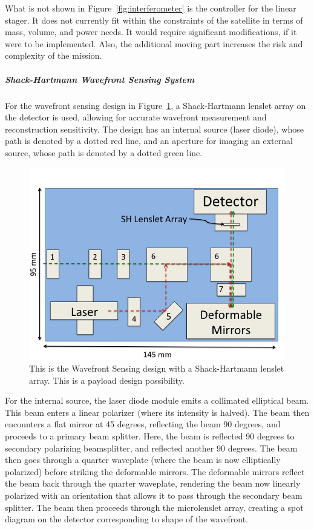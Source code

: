 \documentclass[12pt]{article}
\begin{document}
What is not shown in Figure~\ref{fig:interferometer} is the controller for the linear stager. It does not currently fit within the constraints of the satellite in terms of mass, volume, and power needs. It would require significant modifications, if it were to be implemented. Also, the additional moving part increases the risk and complexity of the mission.

\subparagraph{Shack-Hartmann Wavefront Sensing System}
For the wavefront sensing design in Figure~\ref{fig:SHWFS}, a Shack-Hartmann lenslet array on the detector is used, allowing for accurate wavefront measurement and reconstruction sensitivity. The design has an internal source (laser diode), whose path is denoted by a dotted red line, and an aperture for imaging an external source, whose path is denoted by a dotted green line.

\begin{figure}[ht]
\centering
  \includegraphics[width=5in]{images/payload_SHWFS.jpg}
\caption{This is the Wavefront Sensing design with a Shack-Hartmann lenslet array.  This is a payload design possibility.}
\label{fig:SHWFS}
\end{figure}

For the internal source, the laser diode module emits a collimated elliptical beam. This beam enters a linear polarizer (where its intensity is halved). The beam then encounters a flat mirror at 45 degrees, reflecting the beam 90 degrees, and proceeds to a primary beam splitter. Here, the beam is reflected 90 degrees to secondary polarizing beamsplitter, and reflected another 90 degrees. The beam then goes through a quarter waveplate (where the beam is now elliptically polarized) before striking the deformable mirrors. The deformable mirrors reflect the beam back through the quarter waveplate, rendering the beam now linearly polarized with an orientation that allows it to pass through the secondary beam splitter. The beam then proceeds through the microlenslet array, creating a spot diagram on the detector corresponding to shape of the wavefront.
\end{document}
